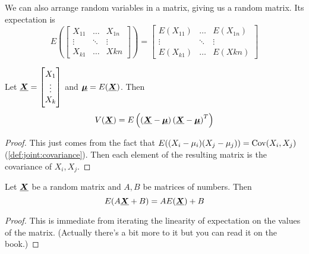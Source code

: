 \documentclass[12pt]{extarticle}
\newcommand{\cov}{{\operatorfont Cov}}
\renewcommand{\vec}[1]{\uvec{#1}}
\begin{document}
We can also arrange random variables in a matrix, giving us a random matrix.
Its expectation is
\begin{equation}
    E\left(\begin{bmatrix}
        X_{11} & \dots  & X_{1n} \\
        \vdots & \ddots & \vdots \\
        X_{k1} & \dots  & X{kn}
    \end{bmatrix}\right) =
    \begin{bmatrix}
        E(X_{11}) & \dots  & E(X_{1n}) \\
        \vdots    & \ddots & \vdots    \\
        E(X_{k1}) & \dots  & E(X{kn})
    \end{bmatrix}
\end{equation}

\begin{proposition}
    \label{prop:gen:variance_mat}
    Let $\vec X =
        \begin{bmatrix}
            X_1    \\
            \vdots \\
            X_k
        \end{bmatrix}$ and $\vec \mu = E(\vec X)$.
    Then
    \begin{equation}
        V(\vec X) = E \left( \left(\vec X - \vec \mu\right) \left(\vec X - \vec \mu\right)^T \right)
    \end{equation}
\end{proposition}

\begin{proof}
    This just comes from the fact that $E((X_i - \mu_i)(X_j - \mu_j)) = \cov(X_i, X_j)$ (\autoref{def:joint:covariance}).
    Then each element of the resulting matrix is the covariance of $X_i, X_j$.
\end{proof}

\begin{theorem}
    Let $\vec X$ be a random matrix and $A, B$ be matrices of numbers.
    Then
    \begin{equation}
        E(A \vec X + B) = A E(\vec X) + B
    \end{equation}
\end{theorem}
\begin{proof}
    This is immediate from iterating the linearity of expectation on the values of the matrix.
    (Actually there's a bit more to it but you can read it on the book.)
\end{proof}
\end{document}
